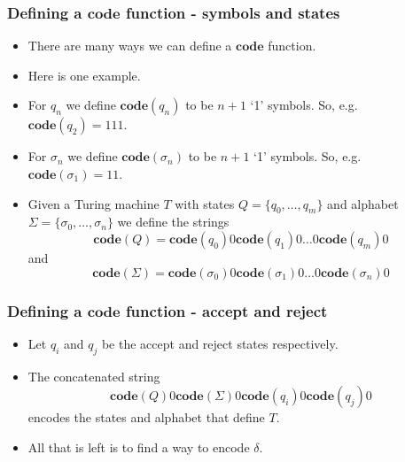 \documentclass[handout]{beamer}
\newcommand{\co}{\mathbf{code}}
\begin{document}
\begin{frame}
\frametitle{Defining a $\co$ function - symbols and states}
\begin{itemize}
\item There are many ways we can define a $\co$ function.
\item Here is one example.
\item For $q_n$ we define $\co(q_n)$ to be $n+1$ `1' symbols. So, e.g. $\co(q_2)=111$.
\item For $\sigma_n$ we define $\co(\sigma_n)$ to be $n+1$ `1' symbols. So, e.g. $\co(\sigma_1)=11$.
\item Given a Turing machine $T$ with states $Q=\{q_0,\ldots,q_m\}$ and alphabet $\Sigma=\{\sigma_0,\ldots,\sigma_n\}$ we define the strings 
\begin{equation*}\co(Q)=\co(q_0)0\co(q_1)0\ldots0\co(q_m)0\end{equation*}
and
\begin{equation*}\co(\Sigma)=\co(\sigma_0)0\co(\sigma_1)0\ldots0\co(\sigma_n)0\end{equation*}
\end{itemize}
\end{frame}

\begin{frame}
\frametitle{Defining a $\co$ function - accept and reject}
\begin{itemize}
\item Let $q_i$ and $q_j$ be the accept and reject states respectively. 
\vspace{0.7cm}
\item The concatenated string \[\co(Q)0\co(\Sigma)0\co(q_i)0\co(q_j)0\] encodes the states and alphabet that define $T$.
\vspace{0.7cm}
\item All that is left is to find a way to encode $\delta$.
\end{itemize}
\end{frame}
\end{document}
